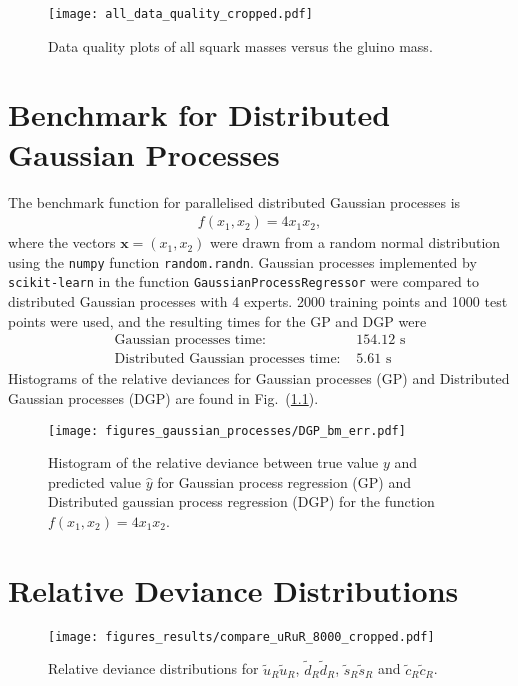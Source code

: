 \documentclass[twoside,english]{uiofysmaster}
\begin{document}
{{\begin{appendices}
\begin{figure}
\centering
\texttt{[image: all\_data\_quality\_cropped.pdf]}
\caption{Data quality plots of all squark masses versus the gluino mass.}
\end{figure}

\chapter{Benchmark for Distributed Gaussian Processes}\label{App:DGP Benchmark}

The benchmark function for parallelised distributed Gaussian processes is
\begin{align*}
f(x_1, x_2) =  4x_1x_2,
\end{align*}
where the vectors $\textbf{x} = (x_1, x_2)$ were drawn from a random normal distribution using the \verb|numpy| function \verb|random.randn|. Gaussian processes implemented by \verb|scikit-learn| in the function \verb|GaussianProcessRegressor| were compared to distributed Gaussian processes with 4 experts. 2000 training points and 1000 test points were used, and the resulting times for the GP and DGP were
\begin{align}
\text{Gaussian processes time: }& 154.12 \text{ s}\\
\text{Distributed Gaussian processes time: }& 5.61 \text{ s}
\end{align}
Histograms of the relative deviances for Gaussian processes (GP) and Distributed Gaussian processes (DGP) are found in Fig.\ (\ref{Fig:: gaussian process : DGP BM error histogram}).

\begin{figure}
\centering
\texttt{[image: figures\_gaussian\_processes/DGP\_bm\_err.pdf]}
\caption{Histogram of the relative deviance between true value $y$ and predicted value $\hat{y}$ for Gaussian process regression (GP) and Distributed gaussian process regression (DGP) for the function $f(x_1,x_2) = 4x_1 x_2$.}
\label{Fig:: gaussian process : DGP BM error histogram}
\end{figure}

\chapter{Relative Deviance Distributions}\label{App:: Relative Deviance Distributions}


\begin{figure}
\centering
\texttt{[image: figures\_results/compare\_uRuR\_8000\_cropped.pdf]}
\caption{Relative deviance distributions for $\widetilde{u}_R \widetilde{u}_R$, $\widetilde{d}_R \widetilde{d}_R$, $\widetilde{s}_R \widetilde{s}_R$ and $\widetilde{c}_R \widetilde{c}_R$.}
\end{figure}


\end{appendices}}}
\end{document}
